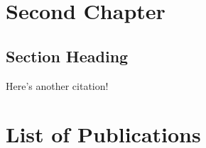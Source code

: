 \documentclass[11pt,oneside]{book}
\begin{document}

\chapter{Second Chapter}

\section{Section Heading}
Here's another citation! \citep{lshort}

\putbib



\backmatter

\chapter*{List of Publications}
\nocite{lim:etal:kdtei:2016,markdown:overleaf}   %

{\renewcommand{\bibsection}{}
\putbib
}
\end{document}
